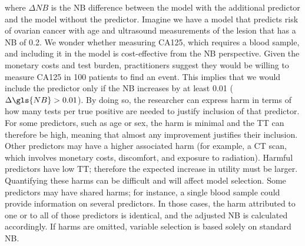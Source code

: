 where $\Delta NB$ is the \gls{NB} difference between the model with the additional predictor and the model without the predictor. Imagine we have a model that predicts risk of ovarian cancer with age and ultrasound measurements of the lesion that has a \gls{NB} of 0.2. We wonder whether measuring CA125, which requires a blood sample, and including it in the model is cost-effective from the \gls{NB} perspective. Given the monetary costs and test burden, practitioners suggest they would be willing to measure CA125 in 100 patients to find an event. This implies that we would include the predictor only if the \gls{NB} increases by at least 0.01 ($\Delta \gls{NB} > 0.01$). By doing so, the researcher can express harm in terms of how many tests per true positive are needed to justify inclusion of that predictor. For some predictors, such as age or sex, the harm is minimal and the TT can therefore be high, meaning that almost any improvement justifies their inclusion. Other predictors may have a higher associated harm (for example, a CT scan, which involves monetary costs, discomfort, and exposure to radiation). Harmful predictors have low TT; therefore the expected increase in utility must be larger. Quantifying these harms can be difficult and will affect model selection. Some predictors may have shared harms; for instance, a single blood sample could provide information on several predictors. In those cases, the harm attributed to one or to all of those predictors is identical, and the adjusted \gls{NB} is calculated accordingly. If harms are omitted, variable selection is based solely on standard \gls{NB}.

